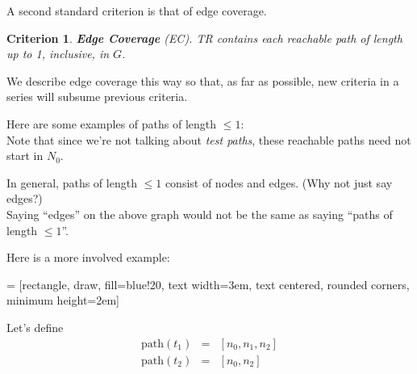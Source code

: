 \documentclass[11pt]{article}
\newtheorem{crit}{Criterion}
\begin{document}
A second standard criterion is that of edge coverage.
\begin{crit}
{\bf Edge Coverage} (EC). TR contains each reachable path of length up
to 1, inclusive, in $G$.
\end{crit}
We describe edge coverage this way so that, as far as possible, new
criteria in a series will subsume previous criteria.

{\sf Here are some examples of paths of length $\le 1$:}\\[1em]
Note that since we're not talking about \emph{test paths}, these
reachable paths need not start in $N_0$.

In general, paths of length $\le 1$ consist of nodes and edges. {\sf (Why not just
say edges?)}\\[3em]

Saying ``edges'' on the above graph would not be the same as saying ``paths
of length $\le 1$''.

\newpage
Here is a more involved example:

 = [rectangle, draw, fill=blue!20, 
    text width=3em, text centered, rounded corners, minimum height=2em]

\begin{center}
\end{center}

Let's define
\begin{eqnarray*}
\mbox{path}(t_1) &=& [n_0, n_1, n_2] \\
\mbox{path}(t_2) &=& [n_0, n_2] 
\end{eqnarray*}
\end{document}
